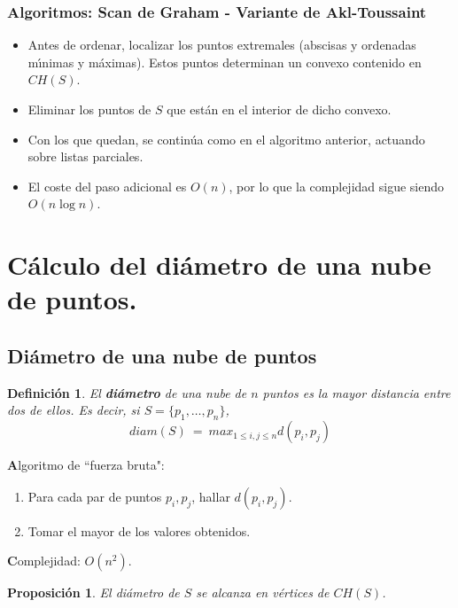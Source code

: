 \documentclass[ebook,oneside]{memoir}
\newtheorem{prop}[thm]{Proposición}
\newtheorem{defn}[thm]{Definición}
\begin{document}
\subsubsection{Algoritmos: Scan de Graham - Variante de Akl-Toussaint}

\begin{itemize}
  \item Antes de ordenar, localizar los puntos extremales (abscisas
y ordenadas m\'{\i}nimas y m\'{a}ximas). Estos puntos determinan un convexo
contenido en $CH(S)$.
  \item Eliminar los puntos de $S$ que est\'{a}n en el interior de dicho
convexo.
  \item Con los que quedan, se contin\'{u}a como en el algoritmo
anterior, actuando sobre listas parciales.
  \item El coste del paso adicional es $O(n)$, por lo que la
complejidad sigue siendo $O(n\log n)$.
\end{itemize}


\section{C\'{a}lculo del di\'{a}metro de una nube de puntos.}

\subsection{Di\'{a}metro de una nube de puntos}

\begin{defn} El \textbf{di\'{a}metro} de una nube de $n$
puntos es la mayor distancia entre dos de ellos. Es decir, si
$S=\{p_1,\dots,p_n\}$, $$diam(S) \ = \ \displaystyle{{ max}_{1\leq i,j \leq
n}}d(p_i,p_j)$$
\end{defn}

{\textbf Algoritmo de ``fuerza bruta":}

\begin{enumerate}
  \item Para cada par de puntos $p_i,p_j$, hallar $d(p_i,p_j)$.
  \item Tomar el mayor de los valores obtenidos.
\end{enumerate}

{\textbf Complejidad:} $O(n^2)$.

\begin{prop} El di\'{a}metro de $S$ se alcanza en v\'{e}rtices
de $CH(S)$.
\end{prop}
\end{document}
